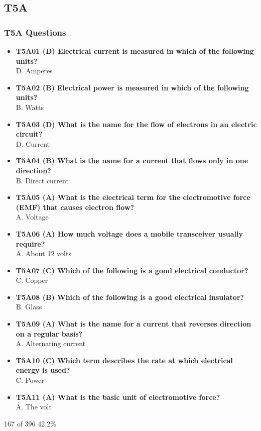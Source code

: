 \documentclass[10pt]{beamer}
\begin{document}
\subsection{T5A}
\begin{frame}
\frametitle{T5A Questions}
\begin{itemize}[<+->]
\tiny
\item\textbf{T5A01 (D) Electrical current is measured in which of the following units?}\\D. Amperes
\item\textbf{T5A02 (B) Electrical power is measured in which of the following units?}\\B. Watts
\item\textbf{T5A03 (D) What is the name for the flow of electrons in an electric circuit?}\\D. Current
\item\textbf{T5A04 (B) What is the name for a current that flows only in one direction?}\\B. Direct current
\item\textbf{T5A05 (A) What is the electrical term for the electromotive force (EMF) that causes electron flow?}\\A. Voltage
\item\textbf{T5A06 (A) How much voltage does a mobile transceiver usually require?}\\A. About 12 volts
\item\textbf{T5A07 (C) Which of the following is a good electrical conductor?}\\C. Copper
\item\textbf{T5A08 (B) Which of the following is a good electrical insulator?}\\B. Glass
\item\textbf{T5A09 (A) What is the name for a current that reverses direction on a regular basis?}\\A. Alternating current
\item\textbf{T5A10 (C) Which term describes the rate at which electrical energy is used?}\\C. Power
\item\textbf{T5A11 (A) What is the basic unit of electromotive force?}\\A. The volt
\end{itemize}
\tiny 167 of 396  42.2\%
\end{frame}
\end{document}
